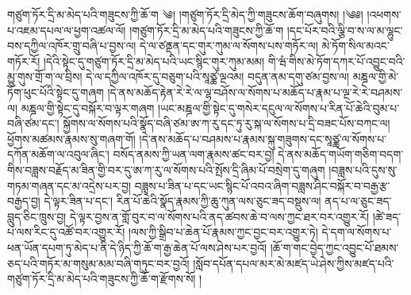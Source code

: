 \setcounter{footnote}{0} 
གཙུག་ཏོར་དྲི་མ་མེད་པའི་གཟུངས་ཀྱི་ཆོ་ག ༄། །གཙུག་ཏོར་དྲི་མེད་ཀྱི་གཟུངས་ཆོག་བཞུགས། །༄༅། །འཕགས་པ་འཇམ་དཔལ་ལ་ཕྱག་འཚལ་ལོ། །གཙུག་ཏོར་དྲི་མ་མེད་པའི་གཟུངས་ཀྱི་ཆོ་ག །དང་པོར་བའི་ལྕི་བ་ས་ལ་མ་ལྷུང་བས་དཀྱིལ་འཁོར་གྲུ་བཞི་པ་བྱས་ལ། དེ་ལ་ཙནྡན་དང་གུར་ཀུམ་ལ་སོགས་པས་གཏོར་ལ། མེ་ཏོག་སིལ་མའང་གཏོར་རོ། །དེའི་སྟེང་དུ་གཙུག་ཏོར་དྲི་མ་མེད་པའི་ཡང་སྙིང་གུར་ཀུམ་མམ། གི་ཝཾ་གིས་མེ་ཏོག་དཀར་པོ་འབྱུང་བའི་མྱུ་གུས་གྲོ་ག་ལ་བྲིས། དེ་ལ་དཀྱིལ་འཁོར་དུ་བཅུག་པའི་སཱཙྪ་ལྔའམ། བདུན་ནམ་དགུ་ཙམ་བྱས་ལ། མཎྜལ་གྱི་མེ་ཏོག་ཕུང་པོའི་སྟེང་དུ་གཞག །དེ་ནས་མཆོད་རྟེན་རེ་རེ་ལ་ལྷ་བཤོས་ལ་སོགས་པ་མཆོད་པ་རྣམ་པ་ལྔ་རེ་རེ་བཤམས་ལ། མཎྜལ་གྱི་སྟེང་དུ་བསྐོར་བ་ལྟར་གཞག །ཡང་མཎྜལ་གྱི་སྟེང་དུ་གསེར་དངུལ་ལ་སོགས་པ་རིན་པོ་ཆེའི་བུམ་པ་བཞི་ཙམ་དང་། སྐྱོགས་ལ་སོགས་པའི་སྣོད་བཞི་ཙམ་ཨ་ཀ་རུ་དང་ཏུ་རུ་སྐ་ལ་སོགས་པ་དྲི་བཟང་པོས་བཀང་ལ། ཕྱོགས་མཚམས་རྣམས་སུ་གཞག་གོ། །དེ་ནས་མཆོད་པ་བཤམས་པ་རྣམས་སྐུ་གཟུགས་དང་སཱཙྪ་ལ་སོགས་པ་དཀོན་མཆོག་ལ་འབུལ་ཞིང་། བསོད་ནམས་ཀྱི་ཡན་ལག་རྣམས་ཚང་བར་བྱ། དེ་ནས་མཆོད་གཡོག་གཅིག་བདག་གིས་བཟླས་བརྗོད་མ་ཟིན་གྱི་བར་དུ་ཨ་ཀ་རུ་ལ་སོགས་པའི་སྤོས་དྲི་ཞིམ་པོ་བསྲེག་དུ་གཞུག །བཟླས་པའི་དུས་སུ་གཏམ་གཞན་དང་མ་འདྲེས་པར་བྱ། བཟླས་པ་ཟིན་པ་དང་ཡང་སྙིང་པོ་འབའ་ཞིག་བཟླས་ཤིང་བསྐོར་བ་བརྒྱ་རྩ་བརྒྱད་བྱ། དེ་ལྟར་ཟིན་པ་དང་། རིན་པོ་ཆེའི་སྣོད་རྣམས་ཀྱི་ཆུ་ཀུན་ལས་ཅུང་ཟད་བསྡུས་ལ། ནད་པ་ལ་ཅུང་ཟད་བླུད་ཅིང་ཁྲུས་བྱ། དེ་ལྟར་བྱས་ན་གློ་བུར་བ་ལ་སོགས་པའི་ནད་ཚབས་ཆེ་བ་ལས་ཀྱང་ཐར་བར་འགྱུར་རོ། །ཚེ་ཟད་པ་ལས་རིང་དུ་འཚོ་བར་འགྱུར་རོ། །ལས་ཀྱི་སྒྲིབ་པ་ཆེན་པོ་རྣམས་ཀྱང་བྱང་བར་འགྱུར་ཏེ། དེ་དག་ལ་སོགས་པ་ཕན་ཡོན་དཔག་ཏུ་མེད་པ་ནི་དེ་ཉིད་ཀྱི་ཆོ་ག་རྒྱ་ཆེན་པོ་ལས་ཤེས་པར་བྱའོ། །ཆོ་ག་གང་བྱེད་ཀྱང་འབྱུང་པོ་ཐམས་ཅད་པའི་གཏོར་མ་གསུམ་མམ་བཞི་གཏུང་བར་བྱའོ། །སློབ་དཔོན་དཔལ་མར་མེ་མཛད་ཡེ་ཤེས་ཀྱིས་མཛད་པའི་གཙུག་ཏོར་དྲི་མ་མེད་པའི་གཟུངས་ཀྱི་ཆོ་ག་རྫོགས་སོ། །
